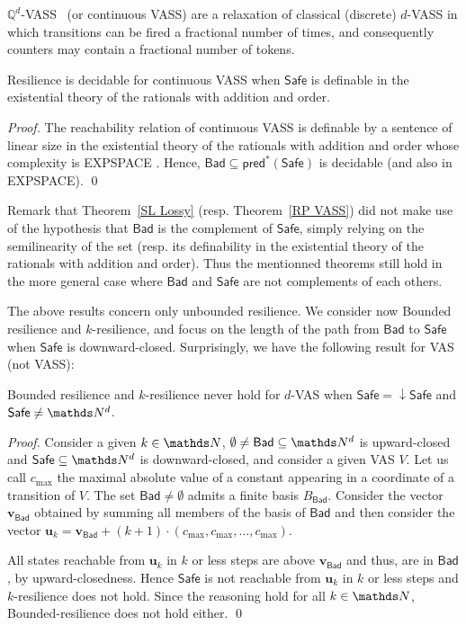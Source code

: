 \documentclass[runningheads]{llncs}
\newcommand{\pred}{\textsf{pred}}
\newcommand{\Bad}{\textsf{Bad}}
\newcommand{\Safe}{\textsf{Safe}}
\begin{document}
$\mathds{Q}^d$-VASS~\cite{DBLP:journals/tocl/BlondinFHH17} (or continuous VASS) are a relaxation of classical (discrete) $d$-VASS in which transitions can be fired a fractional number of times, and consequently counters may contain a fractional number of tokens.

\begin{theorem}\label{RP VASS}
{\sc Resilience} is decidable for continuous VASS when $\Safe$  is
definable in the existential theory of the rationals with addition and order.
\end{theorem}

\begin{proof}
The reachability relation of continuous VASS is definable by a sentence of linear size in the existential theory of
the rationals with addition and order whose complexity is EXPSPACE \cite{DBLP:journals/tocl/BlondinFHH17}. Hence, $\Bad \subseteq \pred^*(\Safe)$ is decidable (and also in EXPSPACE). \qed
\end{proof}


Remark that
Theorem~\ref{SL Lossy} 
(resp. Theorem~\ref{RP VASS})
did not make use of the hypothesis that $\Bad$ is the complement of $\Safe$, simply relying on the
semilinearity of the set (resp. its definability in the existential theory of the rationals with addition and order). Thus 
the mentionned theorems still hold in the more general case where $\Bad$ and $\Safe$ are not complements of each others.

The above results concern only unbounded resilience. We consider now 
{\sc Bounded resilience} and {\sc $k$-resilience}, and focus on the length of
the path from $\Bad$ to $\Safe$
when $\Safe$ is downward-closed. Surprisingly, we have the following result for VAS (not VASS):
\begin{proposition}
{\sc Bounded resilience} and {\sc $k$-resilience} never hold for $d$-VAS when $\Safe = \mathop{\downarrow} \Safe$ and $\Safe \neq \N^d$.
\end{proposition}


\begin{proof}
Consider a given $k \in \N$,
 $\emptyset \neq \Bad \subseteq \N^d$ is upward-closed and $\Safe \subseteq \N^d$ is downward-closed, and
consider a given VAS $V$.
Let us call $c_{\max}$ the maximal absolute value of a constant appearing in a coordinate of a transition of $V$.
The set $\Bad \neq \emptyset$ admits a finite basis $B_\Bad$.
Consider the vector $\textbf{v}_{\Bad}$ obtained by summing all members of the basis of $\Bad$ and then consider the vector
$\textbf{u}_k = \textbf{v}_{\Bad} + (k+1) \cdot (c_{\max}, c_{\max}, \ldots, c_{\max})$.

All states reachable from $\textbf{u}_k$ in $k$ or less steps are above $ \textbf{v}_{\Bad} $
and thus, are in $\Bad$, by upward-closedness.
Hence  $\Safe$ is not reachable from $\textbf{u}_k$ in $k$ or less steps  and {$k$-resilience} does not hold.
Since the reasoning hold for all $k \in \N$, {\sc Bounded-resilience} does not hold either.
\qed
\end{proof}
\end{document}
